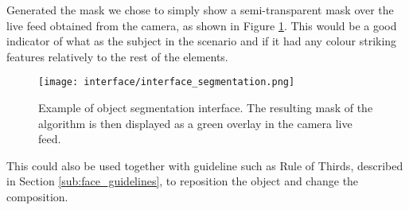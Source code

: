 Generated the mask we chose to simply show a semi-transparent mask over the live feed obtained from the camera, as shown in Figure \ref{fig:interface_segmentation}. This would be a good indicator of what as the subject in the scenario and if it had any colour striking features relatively to the rest of the elements.

\begin{figure}[htbp]
	\centering
	\texttt{[image: interface/interface\_segmentation.png]}
    \caption{Example of object segmentation interface. The resulting mask of the algorithm is then displayed as a green overlay in the camera live feed.}
  	\label{fig:interface_segmentation}
\end{figure}

This could also be used together with guideline such as Rule of Thirds, described in Section \ref{sub:face_guidelines}, to reposition the object and change the composition.

